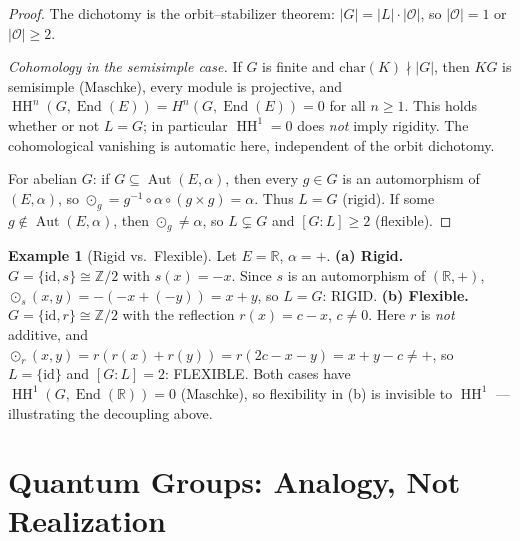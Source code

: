 \documentclass[11pt,twocolumn]{article}
\theoremstyle{plain}\newtheorem{theorem}{Theorem}\newtheorem{proposition}[theorem]{Proposition}\newtheorem{corollary}[theorem]{Corollary}\newtheorem{lemma}[theorem]{Lemma}
\theoremstyle{definition}\newtheorem{definition}[theorem]{Definition}\newtheorem{example}[theorem]{Example}
\theoremstyle{remark}\newtheorem{remark}[theorem]{Remark}
\newcommand{\HH}{\operatorname{HH}}
\newcommand{\Aut}{\operatorname{Aut}}
\newcommand{\End}{\operatorname{End}}
\begin{document}
\begin{proof}
The dichotomy is the orbit--stabilizer theorem: $|G| = |L| \cdot |\mathcal{O}|$, so $|\mathcal{O}| = 1$ or $|\mathcal{O}| \geq 2$.

\emph{Cohomology in the semisimple case.} If $G$ is finite and $\mathrm{char}(K) \nmid |G|$, then $KG$ is semisimple (Maschke), every module is projective, and $\HH^n(G, \End(E)) = H^n(G, \End(E)) = 0$ for all $n \geq 1$. This holds whether or not $L = G$; in particular $\HH^1 = 0$ does \emph{not} imply rigidity. The cohomological vanishing is automatic here, independent of the orbit dichotomy.

For abelian $G$: if $G \subseteq \Aut(E, \alpha)$, then every $g \in G$ is an automorphism of $(E, \alpha)$, so $\odot_g = g^{-1} \circ \alpha \circ (g \times g) = \alpha$. Thus $L = G$ (rigid). If some $g \notin \Aut(E, \alpha)$, then $\odot_g \neq \alpha$, so $L \subsetneq G$ and $[G:L] \geq 2$ (flexible).
\end{proof}

\begin{example}[Rigid vs.\ Flexible]\label{ex:rigid-flexible}
Let $E = \mathbb{R}$, $\alpha = +$.
\textbf{(a) Rigid.} $G = \{\mathrm{id}, s\} \cong \mathbb{Z}/2$ with $s(x) = -x$. Since $s$ is an automorphism of $(\mathbb{R}, +)$, $\odot_s(x,y) = -(-x + (-y)) = x + y$, so $L = G$: RIGID.
\textbf{(b) Flexible.} $G = \{\mathrm{id}, r\} \cong \mathbb{Z}/2$ with the reflection $r(x) = c - x$, $c \neq 0$. Here $r$ is \emph{not} additive, and $\odot_r(x,y) = r(r(x) + r(y)) = r(2c - x - y) = x + y - c \neq +$, so $L = \{\mathrm{id}\}$ and $[G:L] = 2$: FLEXIBLE. Both cases have $\HH^1(G, \End(\mathbb{R})) = 0$ (Maschke), so flexibility in (b) is invisible to $\HH^1$ --- illustrating the decoupling above.
\end{example}


\section{Quantum Groups: Analogy, Not Realization}
\label{sec:quantum}
\end{document}
